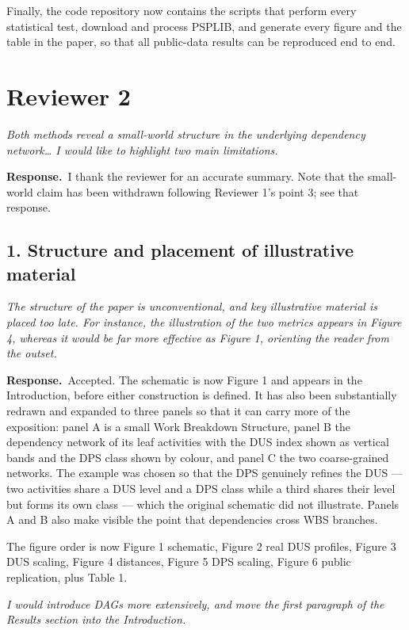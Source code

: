 \documentclass[11pt,a4paper]{article}
\newcommand{\rev}[1]{\medskip\noindent\textit{#1}\par\medskip}
\newcommand{\reply}{\noindent\textbf{Response.}\ }
\begin{document}
Finally, the code repository now contains the scripts that perform every
statistical test, download and process PSPLIB, and generate every figure and the
table in the paper, so that all public-data results can be reproduced end to end.

\section*{Reviewer 2}

\rev{Both methods reveal a small-world structure in the underlying dependency
network\ldots{} I would like to highlight two main limitations.}

\reply I thank the reviewer for an accurate summary. Note that the small-world
claim has been withdrawn following Reviewer 1's point 3; see that response.

\subsection*{1. Structure and placement of illustrative material}

\rev{The structure of the paper is unconventional, and key illustrative material
is placed too late. For instance, the illustration of the two metrics appears in
Figure 4, whereas it would be far more effective as Figure 1, orienting the
reader from the outset.}

\reply Accepted. The schematic is now Figure 1 and appears in the Introduction,
before either construction is defined. It has also been substantially redrawn
and expanded to three panels so that it can carry more of the exposition:
panel A is a small Work Breakdown Structure, panel B the dependency network of
its leaf activities with the DUS index shown as vertical bands and the DPS class
shown by colour, and panel C the two coarse-grained networks. The example was
chosen so that the DPS genuinely refines the DUS --- two activities share a DUS
level and a DPS class while a third shares their level but forms its own class
--- which the original schematic did not illustrate. Panels A and B also make
visible the point that dependencies cross WBS branches.

The figure order is now Figure 1 schematic, Figure 2 real DUS profiles, Figure 3
DUS scaling, Figure 4 distances, Figure 5 DPS scaling, Figure 6 public
replication, plus Table 1.

\rev{I would introduce DAGs more extensively, and move the first paragraph of the
Results section into the Introduction.}
\end{document}
